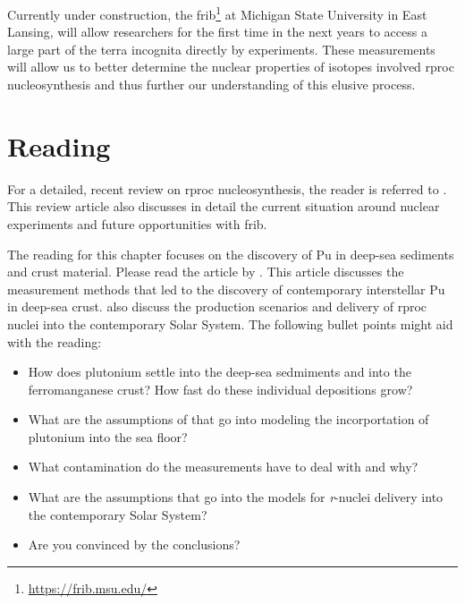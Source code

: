 Currently under construction, the \acf{frib}\footnote{\url{https://frib.msu.edu/}} at Michigan State University in East Lansing, will allow researchers for the first time in the next years to access a large part of the terra incognita directly by experiments. These measurements will allow us to better determine the nuclear properties of isotopes involved \ac{rproc} nucleosynthesis and thus further our understanding of this elusive process.


\section{Reading}

For a detailed, recent review on \ac{rproc} nucleosynthesis, the reader is referred to \citet{kajino19}. This review article also discusses in detail the current situation around nuclear experiments and future opportunities with \ac{frib}.

The reading for this chapter focuses on the discovery of Pu in deep-sea sediments and crust material. Please read the article by \citet{wallner15}. This article discusses the measurement methods that led to the discovery of contemporary interstellar Pu in deep-sea crust. \citet{wallner15} also discuss the production scenarios and delivery of \ac{rproc} nuclei into the contemporary Solar System. The following bullet points might aid with the reading:
\begin{itemize}
    \item How does plutonium settle into the deep-sea sedmiments and into the ferromanganese crust? How fast do these individual depositions grow?
    \item What are the assumptions of \citet{wallner15} that go into modeling the incorportation of plutonium into the sea floor?
    \item What contamination do the measurements have to deal with and why?
    \item What are the assumptions that go into the models for \textit{r}-nuclei delivery into the contemporary Solar System?
    \item Are you convinced by the conclusions?
\end{itemize}